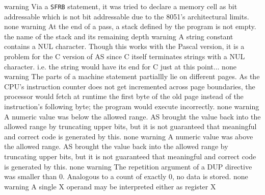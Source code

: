 \documentclass[12pt,twoside]{report}
\newcommand{\tty}[1]{{\tt #1}}
\newcommand{\asname}{{AS}}
\begin{document}
\begin{description}
               {warning}
               {Via a \tty{SFRB} statement, it was tried to declare a memory cell
                as bit addressable which is not bit addressable due to the
                8051's architectural limits.}
               {none}
               {warning}
               {At the end of a pass, a stack defined by the program is
                not empty.}
               {the name of the stack and its remaining depth}
               {warning}
               {A string constant contains a NUL character. Though this
                works with the Pascal version, it is a problem for the
                C version of \asname{} since C itself terminates strings with
                a NUL character. i.e. the string would have its end for
                C just at this point...}
               {none}
               {warning}
               {The parts of a machine statement partiallly lie on
                different pages.  As the CPU's instruction counter does
                not get incremented across page boundaries, the processor
                would fetch at runtime the first byte of the old page
                instead of the instruction's following byte; the program
                would execute incorrectly.}
               {none}
               {warning}
               {A numeric value was below the allowed range.  \asname{} brought
                the value back into the allowed range by truncating upper
                bits, but it is not guaranteed that meaningful and correct
                code is generated by this.}
               {none}
               {warning}
               {A numeric value was above the allowed range.  \asname{} brought
                the value back into the allowed range by truncating upper
                bits, but it is not guaranteed that meaningful and correct
                code is generated by this.}
               {none}
               {warning}
               {The repetition argument of a DUP directive was smaller
                than 0.  Analogous to a count of exactly 0, no data is
                stored.}
               {none}
               {warning}
               {A single X operand may be interpreted either as register X
}
\end{description}
\end{document}
